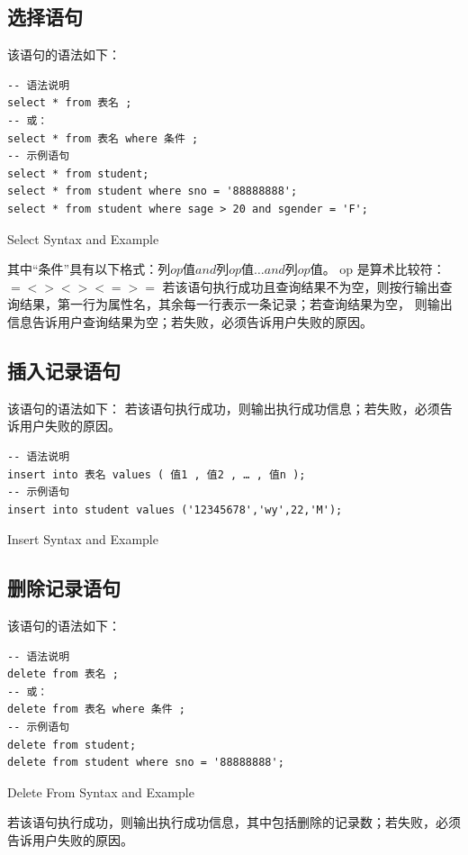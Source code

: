 \documentclass[UTF8]{ctexrep} %
\newenvironment{longlisting}{\captionsetup{type=listing}}{}
\begin{document}
\subsection{选择语句}
该语句的语法如下：
\begin{longlisting}
    \begin{verbatim}
-- 语法说明
select * from 表名 ;
-- 或：
select * from 表名 where 条件 ;
-- 示例语句
select * from student;
select * from student where sno = '88888888';
select * from student where sage > 20 and sgender = 'F';
    \end{verbatim}
    \caption{Select Syntax and Example}
    \label{lst:select_requirements}
\end{longlisting}
其中“条件”具有以下格式：$列 op 值 and 列 op 值 … and 列 op 值$。
op 是算术比较符：$= <> < > <= >=$
若该语句执行成功且查询结果不为空，则按行输出查询结果，第一行为属性名，其余每一行表示一条记录；若查询结果为空，
则输出信息告诉用户查询结果为空；若失败，必须告诉用户失败的原因。

\subsection{插入记录语句}
该语句的语法如下：
若该语句执行成功，则输出执行成功信息；若失败，必须告诉用户失败的原因。
\begin{longlisting}
    \begin{verbatim}
-- 语法说明
insert into 表名 values ( 值1 , 值2 , … , 值n );
-- 示例语句
insert into student values ('12345678','wy',22,'M');
    \end{verbatim}
    \caption{Insert Syntax and Example}
    \label{lst:insert_requirements}
\end{longlisting}

\subsection{删除记录语句}
该语句的语法如下：
\begin{longlisting}
    \begin{verbatim}
-- 语法说明
delete from 表名 ;
-- 或：
delete from 表名 where 条件 ;
-- 示例语句
delete from student;
delete from student where sno = '88888888';
    \end{verbatim}
    \caption{Delete From Syntax and Example}
    \label{lst:delete_from_requirements}
\end{longlisting}
若该语句执行成功，则输出执行成功信息，其中包括删除的记录数；若失败，必须告诉用户失败的原因。
\end{document}
